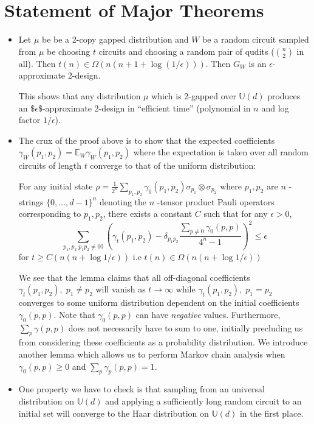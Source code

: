 \documentclass[a4paper]{article}
\begin{document}
\section{Statement of Major Theorems}
\label{sec:orga34642d}
\begin{itemize}
\item Let \(\mu\) be be a 2-copy gapped distribution and \(W\) be a random circuit sampled from \(\mu\) be choosing \(t\) circuits and choosing a random pair of qudits (\({n \choose 2}\) in all). Then \(t(n) \in \Omega(n(n+1 + \log(1/\epsilon)))\). Then \(G_W\) is an \(\epsilon\)-approximate 2-design.

This shows that any distribution \(\mu\) which is 2-gapped over \(\mathbb{U}(d)\) produces an \$\(\epsilon\)\$-approximate 2-design in ``efficient time'' (polynomial in \(n\) and log factor \(1/\epsilon\)).

\item The crux of the proof above is to show that the expected coefficients  \(\gamma_W(p_1,p_2) = \mathbb{E}_W \gamma_W(p_1,p_2)\) where the expectation is taken over all random circuits of length \(t\) converge to that of the uniform distribution:

For any initial state \(\rho = \frac{1}{2^n} \sum_{p_1, p_2} \gamma_0(p_1, p_2) \sigma_{p_1}\otimes \sigma_{p_2}\) where \(p_1,p_2\) are \(n\) -strings \(\{0,\dots,d-1\}^n\) denoting the \(n\) -tensor product Pauli operators corresponding to
\(p_1,p_2\), there exists a constant \(C\) such that for any \(\epsilon > 0\),
$$ \sum_{p_1,p_2 \; p_1p_2 \neq 00} \left( \gamma_t(p_1,p_2) - \delta_{p_1p_2}\frac{\sum_{p \neq 0} \gamma_0(p,p)}{4^n-1} \right)^2 \leq \epsilon$$
for \(t \geq C(n(n+ \log{1/\epsilon}))\) i.e \(t(n) \in \Omega(n(n+ \log{1/\epsilon}))\)

We see that the lemma claims that all off-diagonal coefficients \(\gamma_t(p_1,p_2), \; p_1\neq p_2\) will vanish as \(t \rightarrow \infty\) while \(\gamma_t(p_1,p_2), \; p_1 = p_2\) converges to some uniform distribution dependent on the initial coefficients \(\gamma_0(p,p)\). Note that \(\gamma_0(p,p)\) can have \emph{negative} values. Furthermore, \(\sum_p \gamma(p,p)\) does not necessarily have to sum to one, initially precluding us from considering these coefficients as a probability distribution. We introduce another lemma which allows us to perform Markov chain analysis when \(\gamma_0(p,p) \geq 0\) and \(\sum_p \gamma_p(p,p) = 1\).

\item One property we have to check is that sampling from an universal distribution on \(\mathbb{U}(d)\) and applying a sufficiently long random circuit to an initial set will converge to the Haar distribution on \(\mathbb{U}(d)\) in the first place.


\end{itemize}
\end{document}

